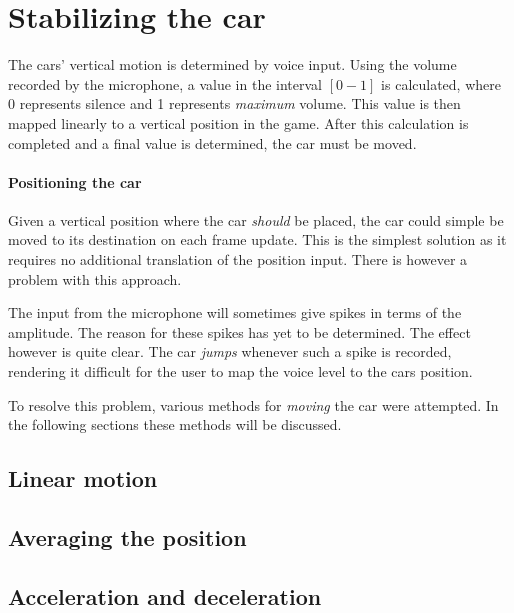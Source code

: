 \section{Stabilizing the car}
The cars' vertical motion is determined by voice input.
Using the volume recorded by the microphone, a value in the interval $[0-1]$ is calculated, where 0 represents silence and 1 represents \textit{maximum} volume.
This value is then mapped linearly to a vertical position in the game.
After this calculation is completed and a final value is determined, the car must be moved.

\paragraph{Positioning the car}
Given a vertical position where the car \textit{should} be placed, the car could simple be moved to its destination on each frame update.
This is the simplest solution as it requires no additional translation of the position input.
There is however a problem with this approach.

The input from the microphone will sometimes give spikes in terms of the amplitude.
The reason for these spikes has yet to be determined.
The effect however is quite clear.
The car \textit{jumps} whenever such a spike is recorded, rendering it difficult for the user to map the voice level to the cars position.

To resolve this problem, various methods for \textit{moving} the car were attempted.
In the following sections these methods will be discussed.

\subsection{Linear motion}

\subsection{Averaging the position}

\subsection{Acceleration and deceleration}
